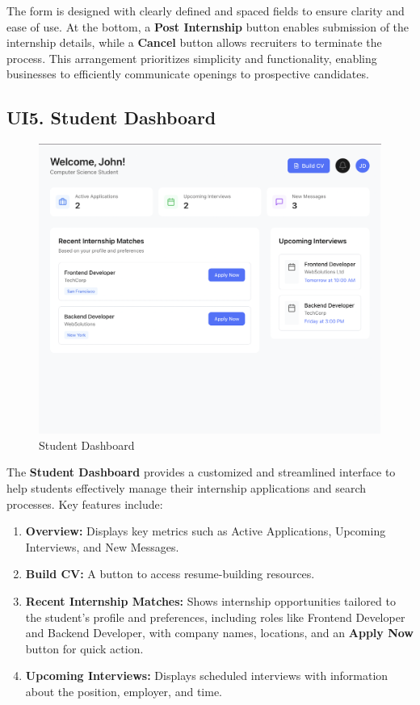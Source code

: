 The form is designed with clearly defined and spaced fields to ensure clarity and ease of use. At the bottom, a \textbf{Post Internship} button enables submission of the internship details, while a \textbf{Cancel} button allows recruiters to terminate the process. This arrangement prioritizes simplicity and functionality, enabling businesses to efficiently communicate openings to prospective candidates.

\subsection{UI5. Student Dashboard}
\label{subsec:student_dashboard_ui}%
\begin{figure}[H]
    \begin{center}
        \includegraphics[width=0.82\linewidth]{JhaBhatiaSharma/imagesDD/StudentDashboard.png}
        \caption{Student Dashboard}
        \label{fig:studentDashboard}
    \end{center}
\end{figure}

The \textbf{Student Dashboard} provides a customized and streamlined interface to help students effectively manage their internship applications and search processes. Key features include:
\begin{enumerate}
    \item \textbf{Overview:} Displays key metrics such as Active Applications, Upcoming Interviews, and New Messages.
    \item \textbf{Build CV:} A button to access resume-building resources.
    \item \textbf{Recent Internship Matches:} Shows internship opportunities tailored to the student's profile and preferences, including roles like Frontend Developer and Backend Developer, with company names, locations, and an \textbf{Apply Now} button for quick action.
    \item \textbf{Upcoming Interviews:} Displays scheduled interviews with information about the position, employer, and time.
\end{enumerate}


